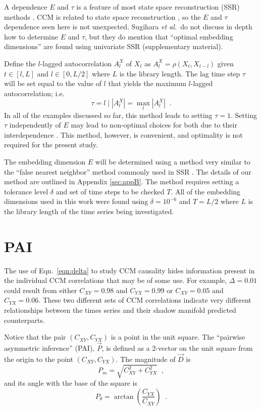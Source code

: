 \documentclass[a4paper,11pt]{article}
\begin{document}
A dependence $E$ and $\tau$ is a feature of most state space reconstruction (SSR) methods \cite{Hong2006,vlachos2009,Small2004}.  CCM is related to state space reconstruction \cite{Sugihara2012}, so the $E$ and $\tau$ dependence seen here is not unexpected.  Sugihara {\em et al.\ }do not discuss in depth how to determine $E$ and $\tau$, but they do mention that ``optimal embedding dimensions'' are found using univariate SSR \cite{Sugihara2012} (supplementary material).  

Define the $l$-lagged autocorrelation $A_l^X$ of $X_t$ as $A_l^X=\rho\left(X_t,X_{t-l}\right)$ given $t\in[l,L]$ and $l\in[0,L/2]$ where $L$ is the library length.  The lag time step $\tau$ will be set equal to the value of $l$ that yields the maximum $l$-lagged autocorrelation; i.e.\
\begin{equation}
\tau = l \;|\; \left|A_l^X\right| = \max_l \left|A_l^X\right|\;\;.
\end{equation}
In all of the examples discussed so far, this method leads to setting $\tau=1$.  Setting $\tau$ independently of $E$ may lead to non-optimal choices for both due to their interdependence \cite{Small2004}.  This method, however, is convenient, and optimality is not required for the present study.

The embedding dimension $E$ will be determined using a method very similar to the ``false nearest neighbor'' method commonly used in SSR \cite{Kennel1992}.  The details of our method are outlined in Appendix \ref{sec:appB}.  The method requires setting a tolerance level $\delta$ and set of time steps to be checked $T$.  All of the embedding dimensions used in this work were found using $\delta=10^{-6}$ and $T=L/2$ where $L$ is the library length of the time series being investigated.

\section{PAI}
The use of Eqn.\ \ref{eqn:delta} to study CCM causality hides information present in the individual CCM correlations that may be of some use.  For example, $\Delta = 0.01$ could result from either $C_{XY} = 0.98$ and $C_{YX} = 0.99$ or $C_{XY} = 0.05$ and $C_{YX} = 0.06$.  These two different sets of CCM correlations indicate very different relationships between the times series and their shadow manifold predicted counterparts.  

Notice that the pair $\left(C_{XY},C_{YX}\right)$ is a point in the unit square.  The ``pairwise asymmetric inference'' (PAI), $\vec{P}$, is defined as a 2-vector on the unit square from the origin to the point $\left(C_{XY},C_{YX}\right)$.  The magnitude of $\vec{D}$ is 
\begin{equation}
P_m = \sqrt{C_{XY}^2+C_{YX}^2}\;\;,
\end{equation}
and its angle with the base of the square is
\begin{equation}
P_\theta = \arctan\left(\frac{C_{YX}}{C_{XY}}\right)\;\;.
\end{equation}
\end{document}
